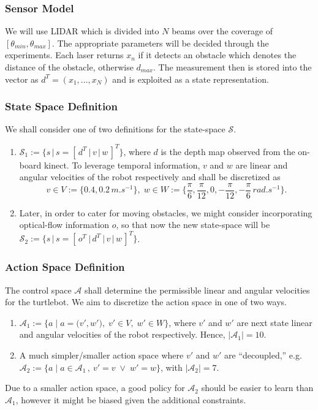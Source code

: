 \documentclass{article}
\begin{document}
\subsubsection{Sensor Model}
We will use LIDAR which is divided into $N$ beams over the coverage of $[\theta_{min}, \theta_{max}]$. The appropriate parameters will be decided through the experiments. Each laser returns $x_n$ if it detects an obstacle which denotes the distance of the obstacle, otherwise $d_{max}$. The measurement then is stored into the vector as $d^T = (x_1,...,x_N)$ and is exploited as a state representation.
\subsubsection{State Space Definition}
We shall consider one of two definitions for the state-space $\mathcal{S}$.
\begin{enumerate}
    \item $\mathcal{S}_1 := \big\{ s\,\big\vert \, s= [\,d^T\:\vert\,v\,\vert\,w\,]^T \big\}$, where $d$ is the depth map observed from the on-board kinect. To leverage temporal information, $v$ and $w$ are linear and angular velocities of the robot respectively and shall be discretized as
    \begin{equation*}
      v\in V := \big\{ 0.4, 0.2\,\si{m.s^{-1}}\big\}, \;w\in W:=\big\{ \frac{\pi}{6}, \frac{\pi}{12}, 0, -\frac{\pi}{12}, -\frac{\pi}{6}\,\si{rad.s^{-1}}\big\}.
    \end{equation*}
    \item Later, in order to cater for moving obstacles, we might consider incorporating optical-flow information $o$, so that now the new state-space will be $\mathcal{S}_2 := \big\{ s\,\big\vert \, s = [\,o^T\:\vert\,d^T\:\vert\,v\,\vert\,w\,]^T \big\}$.
\end{enumerate}

\subsubsection{Action Space Definition}
The control space $\mathcal{A}$ shall determine the permissible linear and angular velocities for the turtlebot. We aim to discretize the action space in one of two ways.
\begin{enumerate}
    \item $\mathcal{A}_1 := \Big\{ a \;\Big\vert\; a = \big(v', w'\big), \;v'\in V, \;w'\in W \Big\}$, where $v'$ and $w'$ are next state linear and angular velocities of the robot respectively. Hence, $\vert \mathcal{A}_1 \vert = 10$.
    \item A much simpler/smaller action space where $v'$ and $w'$ are ``decoupled,'' e.g. $\mathcal{A}_2 := \big\{ a\; \big\vert \;a \in \mathcal{A}_1\,,\: v' = v \;\lor\; w' = w \big\}$, with $\vert \mathcal{A}_2 \vert = 7$.
\end{enumerate}
Due to a smaller action space, a good policy for $\mathcal{A}_2$ should be easier to learn than $\mathcal{A}_1$, however it might be biased given the additional constraints.
\end{document}
